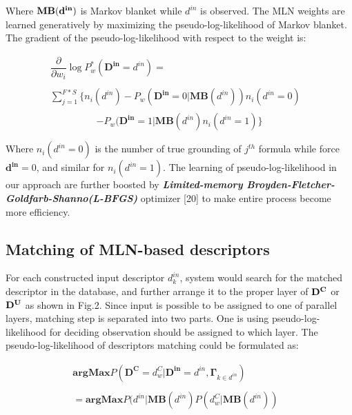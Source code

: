 \documentclass[journal]{IEEEtran}
\begin{document}
Where $\bf{MB}(d^{in})$ is Markov blanket while $d^{in}$ is observed. The MLN weights are learned generatively by maximizing the pseudo-log-likelihood of Markov blanket. The gradient of the pseudo-log-likelihood with respect to the weight is:

\begin{displaymath}
\begin{array}{ll}
\dfrac{\partial}{\partial w_i}\log P^*_w(\mathbf{D^{in}} = d^{in})= &\\\\
\sum^{F*S}_{j=1}\{n_i(d^{in})-P_w(\mathbf{D^{in}}=0|\mathbf{MB}(d^{in}))n_i(d^{in}=0) &\\
\end{array}
\end{displaymath}
\begin{equation}
-P_w(\mathbf{D^{in}}=1|\mathbf{MB}(d^{in})n_i(d^{in}=1)\}
\end{equation}

Where $n_i(d^{in}=0)$ is the number of true grounding of $j^{th}$ formula while force $\mathbf{d^{in}}=0$, and similar for $n_i(d^{in}=1)$. The learning of pseudo-log-likelihood in our approach are further boosted by  \textbf{\textit{Limited-memory Broyden-Fletcher-Goldfarb-Shanno(L-BFGS)}} optimizer [20] to make entire process become more efficiency.

\subsection{Matching of MLN-based descriptors}
For each constructed input descriptor $d^{in}_k$, system would search for the matched descriptor in the database, and further arrange it to the proper layer of $\bf{D^C}$ or $\bf{D^U}$ as shown in Fig.2. Since input is possible to be assigned to one of parallel layers, matching step is separated into two parts. One is using pseudo-log-likelihood for deciding observation should be assigned to which layer. The pseudo-log-likelihood of descriptors matching could be formulated as:


\begin{equation}
\begin{array}{ll}

\mathbf{argMax}P(\mathbf{D^C} = d^C_w  | \mathbf{D^{in}} = d^{in} , \mathbf{\Gamma}_{k \in {d^{in}}}) &\\\\
= \mathbf{argMax}P(d^{in} | \mathbf{MB}(d^{in}){P(d^{C}_w | \mathbf{MB}(d^{in}))}
\end{array}
\end{equation}
\end{document}

